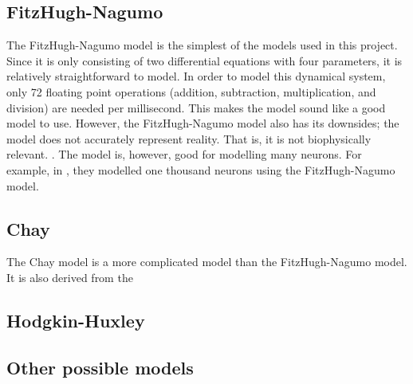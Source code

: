 \documentclass[class={myRUCProject}, crop=false]{standalone}
\begin{document}
\subsection{FitzHugh-Nagumo}
The FitzHugh-Nagumo model is the simplest of the models used in this project. Since it is only consisting of two differential equations with four parameters, it is relatively straightforward to model. In order to model this dynamical system, only 72 floating point operations (addition, subtraction, multiplication, and division) are needed per millisecond. This makes the model sound like a good model to use. However, the FitzHugh-Nagumo model also has its downsides; the model does not accurately represent reality. That is, it is not biophysically relevant. \cite{izhikevich2004model}. The model is, however, good for modelling many neurons. For example, in \cite{Ibrahim2021}, they modelled one thousand neurons using the FitzHugh-Nagumo model.


\subsection{Chay}
The Chay model is a more complicated model than the FitzHugh-Nagumo model. It is also derived from the 


\subsection{Hodgkin-Huxley}

\subsection{Other possible models}
\end{document}
